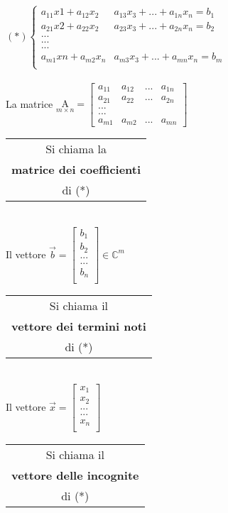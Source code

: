 $(*)
\begin{cases}
    a_{11}x1 + a_{12}x_2 & a_{13}x_3 + ... + a_{1n}x_n= b_1\\
    a_{21}x2 + a_{22}x_2 & a_{23}x_3 + ... + a_{2n}x_n= b_2\\
    ...\\
    ...\\
    ...\\
    a_{m1}xn + a_{m2}x_n & a_{m3}x_3 + ... + a_{mn}x_n= b_m\\
\end{cases}
$\\\\
La matrice $\underset{m\times n}{\textrm{A}}=
\begin{bmatrix}
    a_{11} & a_{12} & ... & a_{1n}\\
    a_{21} & a_{22} & ... & a_{2n}\\
    ...\\
    ...\\
    a_{m1} & a_{m2} & ... & a_{mn}
\end{bmatrix}
$
\begin{tabular}{c}
    Si chiama la \\
    \textbf{matrice dei coefficienti}\\
di (*)
\end{tabular}\\
Il vettore $\vec{b}=
\begin{bmatrix}
    b_1\\
    b_2\\
    ...\\
    ...\\
    b_n\\
\end{bmatrix}
\in\mathbb{C}^m
$
\begin{tabular}{c}
    Si chiama il \\
    \textbf{vettore dei termini noti}\\
di (*)
\end{tabular}\\
Il vettore $\vec{x}=
\begin{bmatrix}
    x_1\\
    x_2\\
    ...\\
    ...\\
    x_n\\
\end{bmatrix}
$
\begin{tabular}{c}
    Si chiama il \\
    \textbf{vettore delle incognite}\\
di (*)
\end{tabular}\\














